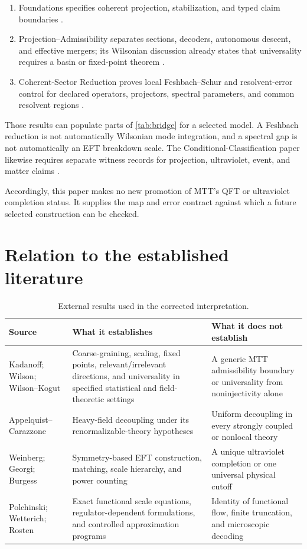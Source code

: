 \documentclass[11pt]{article}
\theoremstyle{definition}
\theoremstyle{remark}
\begin{document}
\begin{enumerate}
\item Foundations specifies coherent projection, stabilization, and typed
  claim boundaries \cite{NeroFoundation}.
\item Projection--Admissibility separates sections, decoders, autonomous
  descent, and effective mergers; its Wilsonian discussion already states
  that universality requires a basin or fixed-point theorem
  \cite{NeroProjection}.
\item Coherent-Sector Reduction proves local Feshbach--Schur and
  resolvent-error control for declared operators, projectors, spectral
  parameters, and common resolvent regions \cite{NeroCoherentReduction}.
\end{enumerate}

Those results can populate parts of \cref{tab:bridge} for a selected model.
A Feshbach reduction is not automatically Wilsonian mode integration, and a
spectral gap is not automatically an EFT breakdown scale.  The
Conditional-Classification paper likewise requires separate witness records
for projection, ultraviolet, event, and matter claims
\cite{NeroClassification}.

Accordingly, this paper makes no new promotion of MTT's QFT or ultraviolet
completion status.  It supplies the map and error contract against which a
future selected construction can be checked.

\section{Relation to the established literature}

\begin{table}[ht]
\centering
\small
\begin{tabularx}{\textwidth}{@{}>{\raggedright\arraybackslash}p{}Y Y@{}}
\toprule
Source & What it establishes & What it does not establish \\
\midrule
Kadanoff; Wilson; Wilson--Kogut
& Coarse-graining, scaling, fixed points, relevant/irrelevant directions,
  and universality in specified statistical and field-theoretic settings
& A generic MTT admissibility boundary or universality from noninjectivity
  alone \\
Appelquist--Carazzone
& Heavy-field decoupling under its renormalizable-theory hypotheses
& Uniform decoupling in every strongly coupled or nonlocal theory \\
Weinberg; Georgi; Burgess
& Symmetry-based EFT construction, matching, scale hierarchy, and power
  counting
& A unique ultraviolet completion or one universal physical cutoff \\
Polchinski; Wetterich; Rosten
& Exact functional scale equations, regulator-dependent formulations, and
  controlled approximation programs
& Identity of functional flow, finite truncation, and microscopic decoding \\
\bottomrule
\end{tabularx}
\caption{External results used in the corrected interpretation.}
\label{tab:literature}
\end{table}
\end{document}
